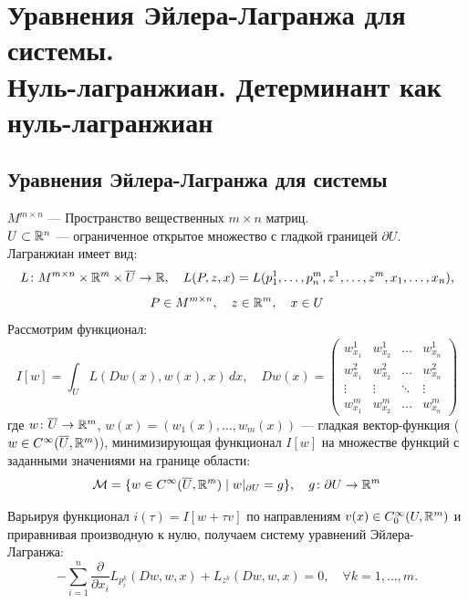 \section{Уравнения Эйлера-Лагранжа для системы.\\
Нуль-лагранжиан. Детерминант как нуль-лагранжиан}
\label{sec:Chapter3} 

\subsection{Уравнения Эйлера-Лагранжа для системы}
\noindent$M^{m \times n}$ --- Пространство вещественных $m \times n$ матриц.\\
$U \subset \mathbb{R}^n$ --- ограниченное открытое множество с гладкой границей
$\partial U$. \\
Лагранжиан имеет вид:
$$L \colon M^{m \times n} \times \mathbb{R}^m \times \overline{U} \to \mathbb{R}, \quad
L(P, z, x) = L(p_1^1, \dots, p_n^m, z^1, \dots, z^m, x_1, \dots, x_n),$$ 
$$P\in M^{m \times n},
\quad z\in\mathbb{R}^m, 
\quad x\in U$$ 
Рассмотрим функционал:
\begin{equation}
    I[w] = \int_U L(Dw(x), w(x), x) \, dx,
    \quad Dw(x) = \begin{pmatrix}
        w^1_{x_1} & w^1_{x_2} & \dots & w^1_{x_n} \\
        w^2_{x_1} & w^2_{x_2} & \dots & w^2_{x_n} \\
        \vdots & \vdots & \ddots & \vdots \\
        w^m_{x_1} & w^m_{x_2} & \dots & w^m_{x_n}
    \end{pmatrix} %
\end{equation}
где $w \colon \overline{U} \to \mathbb{R}^m$, $w(x) = (w_1(x), \dots, w_m(x))$
--- гладкая вектор-функция ($w \in C^\infty(\overline{U}, \mathbb{R}^m)$), 
минимизирующая функционал $I[w]$ на множестве функций с заданными 
значениями на границе области:
\begin{equation}
    \mathcal{M} = \{ w \in C^\infty(\overline{U}, \mathbb{R}^m) \mid w|_{\partial U} = g \},
    \quad g \colon \partial U \to \mathbb{R}^m
\end{equation}

Варьируя функционал $i(\tau) = I[w + \tau v]$ по направлениям 
$v(x) \in C_0^\infty(U, \mathbb{R}^m)$ и приравнивая производную к нулю, 
получаем систему уравнений Эйлера-Лагранжа:
\begin{equation}
    - \sum_{i=1}^n \frac{\partial}{\partial x_i} L_{p_i^k} (Dw, w, x) + L_{z^k}(Dw, w, x) = 0, \quad \forall k = 1, \dots, m.
\end{equation}

